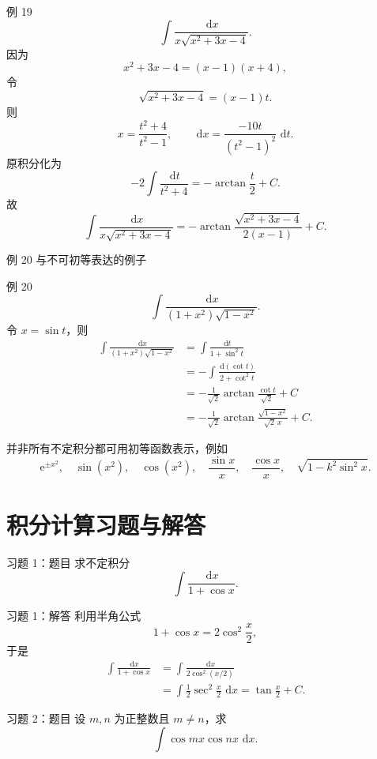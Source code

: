 \documentclass[aspectratio=169,10pt]{ctexbeamer}
\newcommand{\dd}{\,\mathrm{d}}
\newcommand{\ee}{\mathrm{e}}
\begin{document}
\begin{frame}[t]{例 19}
\small
\[
  \int\frac{\dd x}{x\sqrt{x^2+3x-4}}.
\]
因为
\[
  x^2+3x-4=(x-1)(x+4),
\]
令
\[
  \sqrt{x^2+3x-4}=(x-1)t.
\]
则
\[
  x=\frac{t^2+4}{t^2-1},\qquad
  \dd x=\frac{-10t}{(t^2-1)^2}\,\dd t.
\]
原积分化为
\[
  -2\int\frac{\dd t}{t^2+4}
  =-\arctan\frac t2+C.
\]
故
\[
  \boxed{
  \int\frac{\dd x}{x\sqrt{x^2+3x-4}}
  =-\arctan\frac{\sqrt{x^2+3x-4}}{2(x-1)}+C.}
\]
\end{frame}

\begin{frame}[t]{例 20 与不可初等表达的例子}
\small
\begin{block}{例 20}
\[
  \int\frac{\dd x}{(1+x^2)\sqrt{1-x^2}}.
\]
令 $x=\sin t$，则
\[
\begin{aligned}
\int\frac{\dd x}{(1+x^2)\sqrt{1-x^2}}
&=\int\frac{\dd t}{1+\sin^2t}\\
&=-\int\frac{\dd(\cot t)}{2+\cot^2t}\\
&=-\frac1{\sqrt2}\arctan\frac{\cot t}{\sqrt2}+C\\
&=-\frac1{\sqrt2}\arctan\frac{\sqrt{1-x^2}}{\sqrt2\,x}+C.
\end{aligned}
\]
\end{block}

并非所有不定积分都可用初等函数表示，例如
\[
  \ee^{\pm x^2},\quad \sin(x^2),\quad \cos(x^2),\quad
  \frac{\sin x}{x},\quad \frac{\cos x}{x},\quad
  \sqrt{1-k^2\sin^2x}.
\]
\end{frame}

\section{积分计算习题与解答}

\begin{frame}[t]{习题 1：题目}
\small
求不定积分
\[
  \int\frac{\dd x}{1+\cos x}.
\]
\end{frame}

\begin{frame}[t]{习题 1：解答}
\small
利用半角公式
\[
  1+\cos x=2\cos^2\frac{x}{2},
\]
于是
\[
\begin{aligned}
\int\frac{\dd x}{1+\cos x}
&=\int\frac{\dd x}{2\cos^2(x/2)}\\
&=\int\frac12\sec^2\frac{x}{2}\,\dd x
=\tan\frac{x}{2}+C.
\end{aligned}
\]
\end{frame}

\begin{frame}[t]{习题 2：题目}
\small
设 $m,n$ 为正整数且 $m\ne n$，求
\[
  \int\cos mx\cos nx\,\dd x.
\]
\end{frame}
\end{document}

